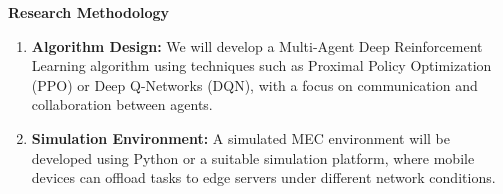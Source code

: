 \documentclass[12pt]{article}
\begin{document}
\vspace{5mm}

\noindent\textbf{\large Research Methodology}

\begin{enumerate} \item \textbf{Algorithm Design:} We will develop a Multi-Agent Deep Reinforcement Learning algorithm using techniques such as Proximal Policy Optimization (PPO) or Deep Q-Networks (DQN), with a focus on communication and collaboration between agents. \item \textbf{Simulation Environment:} A simulated MEC environment will be developed using Python or a suitable simulation platform, where mobile devices can offload tasks to edge servers under different network conditions. 
\end{enumerate}
\end{document}
